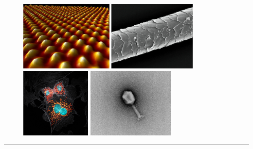 \documentclass[12pt,a4paper]{article}
\begin{document}
\begin{figure}[h]
\includegraphics[height=100pt]{images/atoms.jpg}
\hfill
\includegraphics[height=100pt]{images/hair.jpg}
\hfill
\includegraphics[height=100pt]{images/bpae_cell_mitosis.jpg}
\hfill
\includegraphics[height=100pt]{images/virus.jpg}
\end{figure}

\hrule{}
\end{document}
